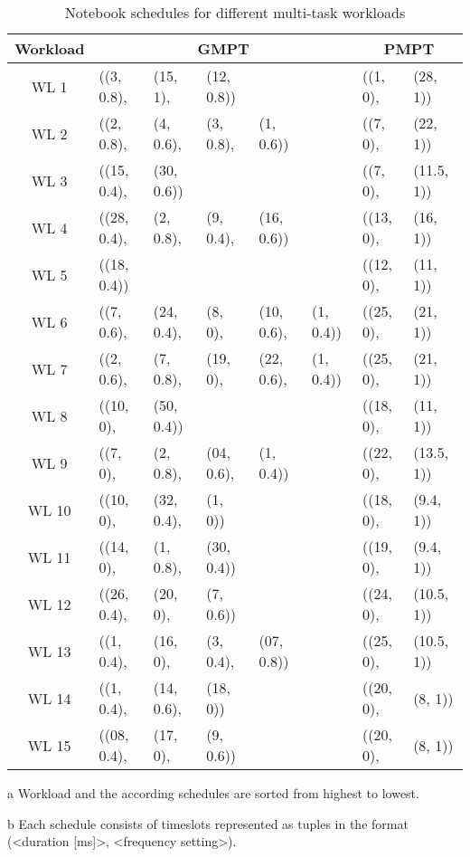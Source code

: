 \begin{table}[htpb]
 \centering
 \begin{threeparttable}
 \setlength\tabcolsep{3pt}
 \caption[Multi-Task Notebook schedules]{Notebook schedules for different multi-task workloads}\label{app:t_ampt_n}
 \begin{tabular}{||c||l l l l l|l l||} 
 \hline
 Workload\tnote{a} & \multicolumn{5}{c|}{GMPT\tnote{b}} & \multicolumn{2}{c||}{PMPT\tnote{b}} \\ [0.5ex]  
 \hline\hline
 WL 1 & ((3, 0.8), & (15, 1), & (12, 0.8)) & & & ((1, 0), & (28, 1))\\
\hline
WL 2 & ((2, 0.8), & (4, 0.6), & (3, 0.8), & (1, 0.6)) & & ((7, 0), & (22, 1))\\
\hline
WL 3 & ((15, 0.4), & (30, 0.6)) & & & & ((7, 0), & (11.5, 1))\\
\hline
WL 4 & ((28, 0.4), & (2, 0.8), & (9, 0.4), & (16, 0.6)) & & ((13, 0), & (16, 1))\\
\hline
WL 5 & ((18, 0.4)) & & & & & ((12, 0), & (11, 1))\\
\hline
WL 6 & ((7, 0.6), & (24, 0.4), & (8, 0), & (10, 0.6), & (1, 0.4)) & ((25, 0), & (21, 1))\\
\hline
WL 7 & ((2, 0.6), & (7, 0.8), & (19, 0), & (22, 0.6), & (1, 0.4)) & ((25, 0), & (21, 1))\\
\hline
WL 8 & ((10, 0), & (50, 0.4)) & & & & ((18, 0), & (11, 1))\\
\hline
WL 9 & ((7, 0), & (2, 0.8), & (04, 0.6), & (1, 0.4)) & & ((22, 0), & (13.5, 1))\\
\hline
WL 10 & ((10, 0), & (32, 0.4), & (1, 0)) & & & ((18, 0), & (9.4, 1))\\
\hline
WL 11 & ((14, 0), & (1, 0.8), & (30, 0.4)) & & & ((19, 0), & (9.4, 1))\\
\hline
WL 12 & ((26, 0.4), & (20, 0), & (7, 0.6)) & & & ((24, 0), & (10.5, 1))\\
\hline
WL 13 & ((1, 0.4), & (16, 0), & (3, 0.4), & (07, 0.8)) & & ((25, 0), & (10.5, 1))\\
\hline
WL 14 & ((1, 0.4), & (14, 0.6), & (18, 0)) & & & ((20, 0), & (8, 1))\\
\hline
WL 15 & ((08, 0.4), & (17, 0), & (9, 0.6)) & & & ((20, 0), & (8, 1))\\
 \hline
\end{tabular}
\begin{tablenotes}
\item [a] Workload and the according schedules are sorted from highest to lowest.
\item [b] Each schedule consists of timeslots represented as tuples in the format\\(<duration [ms]>, <frequency setting>).
\end{tablenotes}
\end{threeparttable}
\end{table}